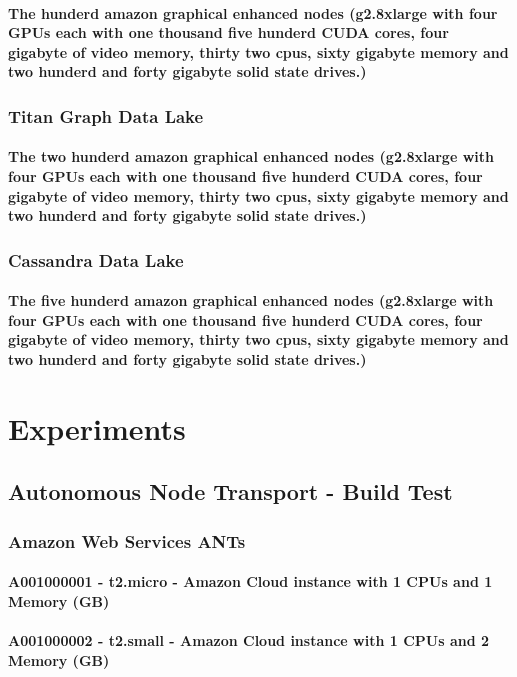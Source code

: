 \documentclass{acm_proc_article-sp}
\begin{document}
\paragraph{The hunderd amazon graphical enhanced nodes (g2.8xlarge with four GPUs each with one thousand five hunderd CUDA cores, four gigabyte of video memory, thirty two cpus, sixty gigabyte memory and two hunderd and forty gigabyte solid state drives.)}
\subsubsection{Titan Graph Data Lake}
\paragraph{The two hunderd amazon graphical enhanced nodes (g2.8xlarge with four GPUs each with one thousand five hunderd CUDA cores, four gigabyte of video memory, thirty two cpus, sixty gigabyte memory and two hunderd and forty gigabyte solid state drives.)}\subsubsection{Cassandra Data Lake}
\paragraph{The five hunderd amazon graphical enhanced nodes (g2.8xlarge with four GPUs each with one thousand five hunderd CUDA cores, four gigabyte of video memory, thirty two cpus, sixty gigabyte memory and two hunderd and forty gigabyte solid state drives.)}
\pagebreak
\section{Experiments}
\subsection{Autonomous Node Transport - Build Test}
\subsubsection{Amazon Web Services ANTs}
\paragraph{A001000001 - t2.micro - Amazon Cloud instance with 1 CPUs and 1 Memory (GB)}
\paragraph{A001000002 - t2.small - Amazon Cloud instance with 1 CPUs and 2 Memory (GB)}
\end{document}
